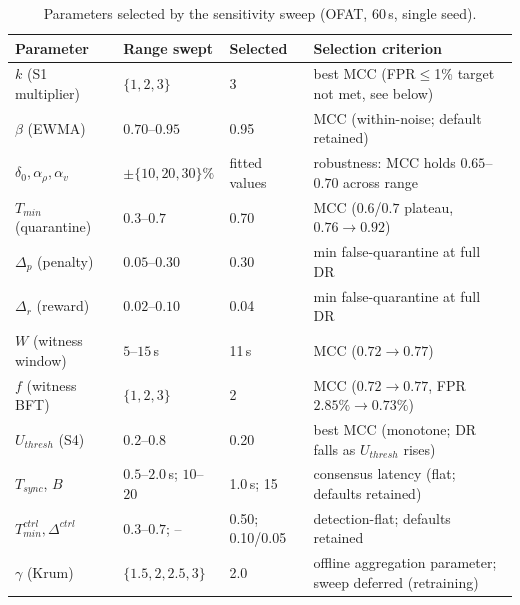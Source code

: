 \documentclass[12pt, a4paper]{report}
\begin{document}
{{\begin{table}[H]
\centering
\caption{Parameters selected by the sensitivity sweep (OFAT, 60\,s, single seed).}
\label{tab:sensitivity_selected}
\footnotesize
\begin{tabular}{|l|l|l|l|}
\hline
\textbf{Parameter} & \textbf{Range swept} & \textbf{Selected} & \textbf{Selection criterion} \\
\hline
$k$ (S1 multiplier) & $\{1,2,3\}$ & 3 & best \ac{MCC} (\ac{FPR}$\leq$1\% target not met, see below) \\
\hline
$\beta$ (EWMA) & $0.70$--$0.95$ & 0.95 & \ac{MCC} (within-noise; default retained) \\
\hline
$\delta_0,\alpha_\rho,\alpha_v$ & $\pm\{10,20,30\}\%$ & fitted values & robustness: \ac{MCC} holds $0.65$--$0.70$ across range \\
\hline
$T_{min}$ (quarantine) & $0.3$--$0.7$ & 0.70 & \ac{MCC} ($0.6$/$0.7$ plateau, $0.76\to0.92$) \\
\hline
$\Delta_p$ (penalty) & $0.05$--$0.30$ & 0.30 & min false-quarantine at full \ac{DR} \\
\hline
$\Delta_r$ (reward) & $0.02$--$0.10$ & 0.04 & min false-quarantine at full \ac{DR} \\
\hline
$W$ (witness window) & $5$--$15$\,s & 11\,s & \ac{MCC} ($0.72\to0.77$) \\
\hline
$f$ (witness BFT) & $\{1,2,3\}$ & 2 & \ac{MCC} ($0.72\to0.77$, \ac{FPR} $2.85\%\to0.73\%$) \\
\hline
$U_{thresh}$ (S4) & $0.2$--$0.8$ & 0.20 & best \ac{MCC} (monotone; \ac{DR} falls as $U_{thresh}$ rises) \\
\hline
$T_{sync}$, $B$ & $0.5$--$2.0$\,s; $10$--$20$ & 1.0\,s; 15 & consensus latency (flat; defaults retained) \\
\hline
$T_{min}^{ctrl},\Delta^{ctrl}$ & $0.3$--$0.7$; -- & 0.50; 0.10/0.05 & detection-flat; defaults retained \\
\hline
$\gamma$ (Krum) & $\{1.5,2,2.5,3\}$ & 2.0 & offline aggregation parameter; sweep deferred (retraining) \\
\hline
\end{tabular}
\end{table}

}}
\end{document}

